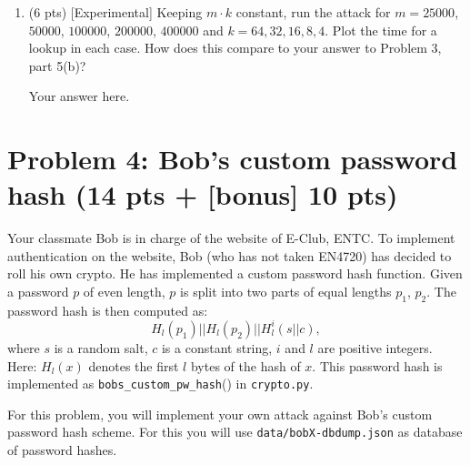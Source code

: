 \documentclass[11pt,letterpaper]{article}
\newenvironment{answer}{\em \color{blue} \begin{adjustwidth}{1cm}{1cm}}{\end{adjustwidth}}
\begin{document}
\begin{enumerate}
\begin{enumerate}
			\begin{answer}
				
				Your answer here.
				
			\end{answer}
			
		\end{enumerate}
		
		\item (6 pts) [Experimental] Keeping $m \cdot k$ constant, run the attack for $m = 25000$, $50000$, $100000$, $200000$, $400000$ and $k = 64, 32, 16, 8, 4$. Plot the time for a lookup in each case. How does this compare to your answer to Problem 3, part 5(b)?
		
		\begin{answer}
			
			
			Your answer here.
			
		\end{answer}
		
	\end{enumerate}
	
	\newpage
	
	\section*{Problem 4: Bob's custom password hash (14 pts + [bonus] 10 pts)}
	
	Your classmate Bob is in charge of the website of E-Club, ENTC. To implement authentication on the website, Bob (who has not taken EN4720) has decided to roll his own crypto. He has implemented a custom password hash function. Given a password $p$ of even length, $p$ is split into two parts of equal lengths $p_1$, $p_2$. The password hash is then computed as:
	\[ H_l(p_1) || H_l(p_2) || H_l^i(s || c) , \]
	where $s$ is a random salt, $c$ is a constant string, $i$ and $l$ are positive integers. Here: $H_l(x)$ denotes the first $l$ bytes of the hash of $x$. This password hash is implemented as \texttt{bobs\_custom\_pw\_hash}() in \texttt{crypto.py}.
	
	
	For this problem, you will implement your own attack against Bob's custom password hash scheme. For this you will use \texttt{data/bobX-dbdump.json} as database of password hashes.
	
\end{document}
